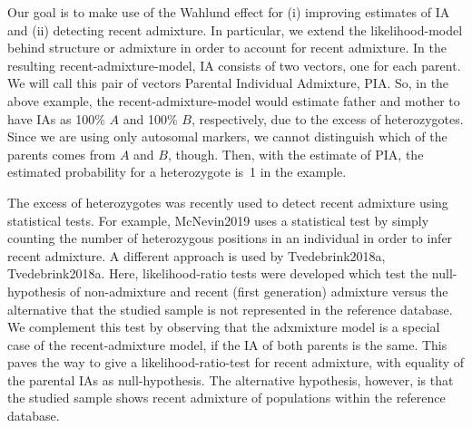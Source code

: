 \documentclass[12pt]{article}
\theoremstyle{definition}
\begin{document}
Our goal is to make use of the Wahlund effect for (i) improving
estimates of IA and (ii) detecting recent admixture.  In particular,
we extend the likelihood-model behind {\sc structure} or {\sc
  admixture} in order to account for recent admixture. In the
resulting recent-admixture-model, IA consists of two vectors, one for
each parent. We will call this pair of vectors Parental Individual
Admixture, PIA. So, in the above example, the recent-admixture-model
would estimate father and mother to have IAs as 100\% $A$ and 100\%
$B$, respectively, due to the excess of heterozygotes.  Since we are
using only autosomal markers, we cannot distinguish which of the
parents comes from $A$ and $B$, though. Then, with the estimate of
PIA, the estimated probability for a heterozygote is~1 in the example.

The excess of heterozygotes was recently used to detect recent
admixture using statistical tests. For example, \cite{article}{McNevin2019}
uses a statistical test by simply counting the number of heterozygous
positions in an individual in order to infer recent admixture. A
different approach is used by \cite{article}{Tvedebrink2018a,
  Tvedebrink2018a}. Here, likelihood-ratio tests were developed which
test the null-hypothesis of non-admixture and recent (first
generation) admixture versus the alternative that the studied sample
is not represented in the reference database. We complement this test
by observing that the adxmixture model is a special case of the
recent-admixture model, if the IA of both parents is the same. This
paves the way to give a likelihood-ratio-test for recent admixture,
with equality of the parental IAs as null-hypothesis. The alternative
hypothesis, however, is that the studied sample shows recent admixture
of populations within the reference database.
\end{document}
